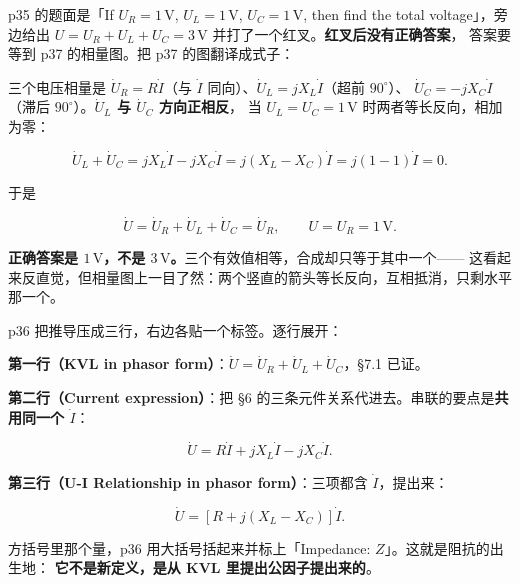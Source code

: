 \documentclass[11pt]{ctexart}
\begin{document}
p35 的题面是「If $U_R=1\,\mathrm{V}$, $U_L=1\,\mathrm{V}$, $U_C=1\,\mathrm{V}$, then find the total
voltage」，旁边给出 $U=U_R+U_L+U_C=3\,\mathrm{V}$ 并打了一个红叉。\textbf{红叉后没有正确答案}，
答案要等到 p37 的相量图。把 p37 的图翻译成式子：

三个电压相量是 $\dot U_R=R\dot I$（与 $\dot I$ 同向）、$\dot U_L=jX_L\dot I$（超前 $90^\circ$）、
$\dot U_C=-jX_C\dot I$（滞后 $90^\circ$）。\textbf{$\dot U_L$ 与 $\dot U_C$ 方向正相反}，
当 $U_L=U_C=1\,\mathrm{V}$ 时两者等长反向，相加为零：

\[ \dot U_L+\dot U_C=jX_L\dot I-jX_C\dot I
   =j\left(X_L-X_C\right)\dot I=j(1-1)\dot I=0 . \]

于是

\[ \dot U=\dot U_R+\dot U_L+\dot U_C=\dot U_R ,\qquad U=U_R=1\,\mathrm{V} . \]

\textbf{正确答案是 $1\,\mathrm{V}$，不是 $3\,\mathrm{V}$。}三个有效值相等，合成却只等于其中一个——
这看起来反直觉，但相量图上一目了然：两个竖直的箭头等长反向，互相抵消，只剩水平那一个。



p36 把推导压成三行，右边各贴一个标签。逐行展开：

\textbf{第一行（KVL in phasor form）}：$\dot U=\dot U_R+\dot U_L+\dot U_C$，§7.1 已证。

\textbf{第二行（Current expression）}：把 §6 的三条元件关系代进去。串联的要点是\textbf{共用同一个 $\dot I$}：

\[ \dot U=R\dot I+jX_L\dot I-jX_C\dot I . \]

\textbf{第三行（U-I Relationship in phasor form）}：三项都含 $\dot I$，提出来：

\[ \dot U=\left[R+j\left(X_L-X_C\right)\right]\dot I . \]

方括号里那个量，p36 用大括号括起来并标上「Impedance: $Z$」。这就是阻抗的出生地：
\textbf{它不是新定义，是从 KVL 里提出公因子提出来的}。

\end{document}
